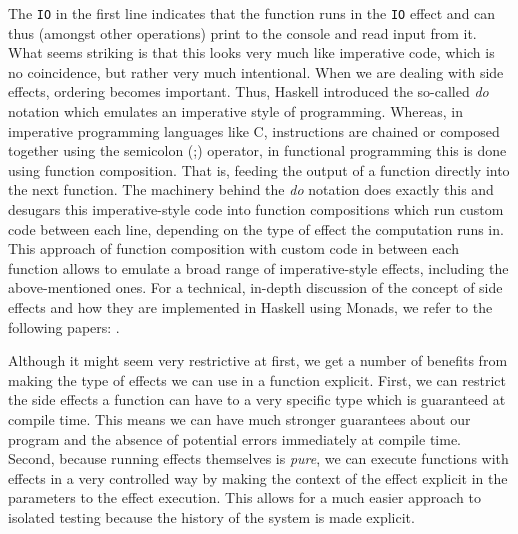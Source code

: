 The \texttt{IO} in the first line indicates that the function runs in the \texttt{IO} effect and can thus (amongst other operations) print to the console and read input from it. What seems striking is that this looks very much like imperative code, which is no coincidence, but rather very much intentional. When we are dealing with side effects, ordering becomes important. Thus, Haskell introduced the so-called \textit{do} notation which emulates an imperative style of programming. Whereas, in imperative programming languages like C, instructions are chained or composed together using the semicolon (;) operator, in functional programming this is done using function composition. That is, feeding the output of a function directly into the next function. The machinery behind the \textit{do} notation does exactly this and desugars this imperative-style code into function compositions which run custom code between each line, depending on the type of effect the computation runs in. This approach of function composition with custom code in between each function allows to emulate a broad range of imperative-style effects, including the above-mentioned ones. For a technical, in-depth discussion of the concept of side effects and how they are implemented in Haskell using Monads, we refer to the following papers: \cite{jones_tackling_2002,moggi_computational_1989,wadler_essence_1992,wadler_monads_1995,wadler_how_1997}.

\medskip

Although it might seem very restrictive at first, we get a number of benefits from making the type of effects we can use in a function explicit. First, we can restrict the side effects a function can have to a very specific type which is guaranteed at compile time. This means we can have much stronger guarantees about our program and the absence of potential errors immediately at compile time. Second, because running effects themselves is \textit{pure}, we can execute functions with effects in a very controlled way by making the context of the effect explicit in the parameters to the effect execution. This allows for a much easier approach to isolated testing because the history of the system is made explicit. 

